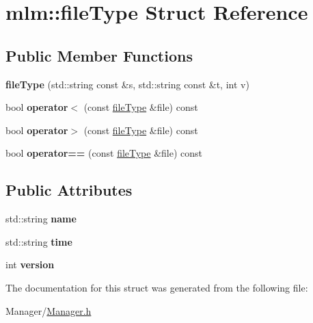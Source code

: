 \hypertarget{structmlm_1_1fileType}{}\section{mlm\+:\+:file\+Type Struct Reference}
\label{structmlm_1_1fileType}
\subsection*{Public Member Functions}
\begin{DoxyCompactItemize}
\item 
\mbox{\label{structmlm_1_1fileType_a83c39b573194921f5413826d20ea0d2a}} 
{\bfseries file\+Type} (std\+::string const \&s, std\+::string const \&t, int v)
\item 
\mbox{\label{structmlm_1_1fileType_abf8f0e42e885214d91df289880644038}} 
bool {\bfseries operator$<$} (const \mbox{\hyperlink{structmlm_1_1fileType}{file\+Type}} \&file) const
\item 
\mbox{\label{structmlm_1_1fileType_a6c371f6f0e5680ff5da070076c17a4a9}} 
bool {\bfseries operator$>$} (const \mbox{\hyperlink{structmlm_1_1fileType}{file\+Type}} \&file) const
\item 
\mbox{\label{structmlm_1_1fileType_a3e90064a78c1b6f20af841d1894b1e83}} 
bool {\bfseries operator==} (const \mbox{\hyperlink{structmlm_1_1fileType}{file\+Type}} \&file) const
\end{DoxyCompactItemize}
\subsection*{Public Attributes}
\begin{DoxyCompactItemize}
\item 
\mbox{\label{structmlm_1_1fileType_aee956e5d720c5102fa7685c18da3d73d}} 
std\+::string {\bfseries name}
\item 
\mbox{\label{structmlm_1_1fileType_a08cf96bb5a040198e36050d0422c6876}} 
std\+::string {\bfseries time}
\item 
\mbox{\label{structmlm_1_1fileType_abb9bd6fa11ebe79adc98ef496587a4a2}} 
int {\bfseries version}
\end{DoxyCompactItemize}


The documentation for this struct was generated from the following file\+:\begin{DoxyCompactItemize}
\item 
Manager/\mbox{\hyperlink{Manager_8h}{Manager.\+h}}\end{DoxyCompactItemize}
